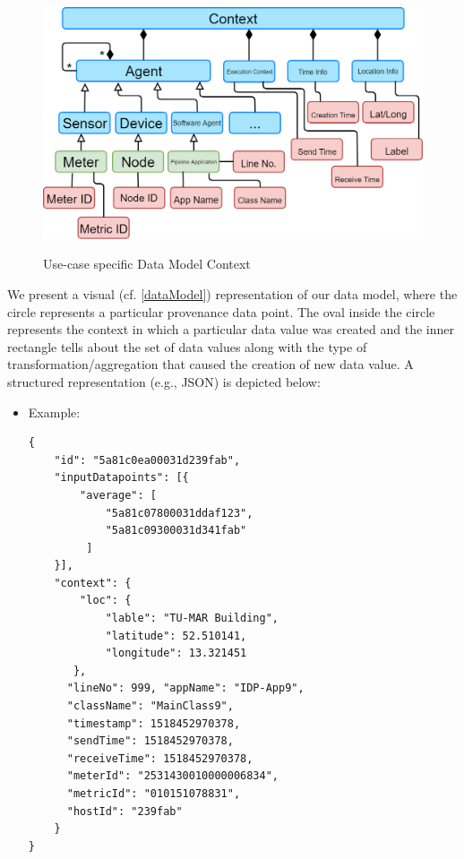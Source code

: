 \begin{itemize}
\begin{figure}[h]
\centering
\includegraphics[width=\linewidth]{figures/contextIdp.png}\\
\caption{Use-case specific Data Model Context}
\label{idpDataModelContext}
\end{figure}
We present a visual (cf. \ref{dataModel}) representation of our data model,  where the circle represents a particular provenance data point. The oval inside the circle represents the context in which a particular data value was created and the inner rectangle tells about the set of data values along with the type of transformation/aggregation that caused the creation of new data value. A structured representation (e.g., JSON) is depicted below:

\begin{itemize}			
			\item Example: 
\begin{lstlisting}			
{
    "id": "5a81c0ea00031d239fab",
    "inputDatapoints": [{ 
        "average": [ 
            "5a81c07800031ddaf123",
            "5a81c09300031d341fab"
         ]
    }],
    "context": {
        "loc": {
            "lable": "TU-MAR Building", 
            "latitude": 52.510141,
            "longitude": 13.321451
       },
      "lineNo": 999, "appName": "IDP-App9",
      "className": "MainClass9",
      "timestamp": 1518452970378,
      "sendTime": 1518452970378,
      "receiveTime": 1518452970378,
      "meterId": "2531430010000006834", 
      "metricId": "010151078831",
      "hostId": "239fab"
    } 
}		
\end{lstlisting}


\end{itemize}
\end{itemize}
